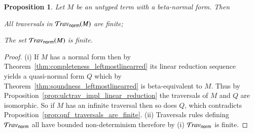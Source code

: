 \documentclass{elsarticle}
\theoremstyle{plain}
\newtheorem{proposition}[theorem]{Proposition}
\theoremstyle{definition}
\newcommand{\normalizing}{{\sf norm}}
\newcommand{\travsetnorm}{\travset_\normalizing}
\begin{document}
\begin{proposition}
\label{prop:ulc_travnorm_finite}
Let $M$ be an untyped term with a beta-normal form. Then
\begin{enumerate*}[label=(\roman*)]
\item All traversals in $\travsetnorm(M)$ are finite;
\item The set $\travsetnorm(M)$ is finite.
\end{enumerate*}
\end{proposition}
\begin{proof}
(i) If $M$ has a normal form then by Theorem~\ref{thm:completeness_leftmostlinearred} its linear reduction sequence yields a quasi-normal form $Q$ which by Theorem~\ref{thm:soundness_leftmostlinearred} is beta-equivalent to $M$. Thus by Proposition~\ref{prop:ulctrav_impl_linear_reduction} the traversals of $M$ and $Q$ are isomorphic. So if $M$ has an infinite traversal then so does $Q$, which contradicts Proposition~\ref{prop:qnf_traversals_are_finite}.
(ii) Traversals rules defining $\travsetnorm$ all have bounded non-determinism therefore by (i) $\travsetnorm$ is finite.
\end{proof}

\end{document}
